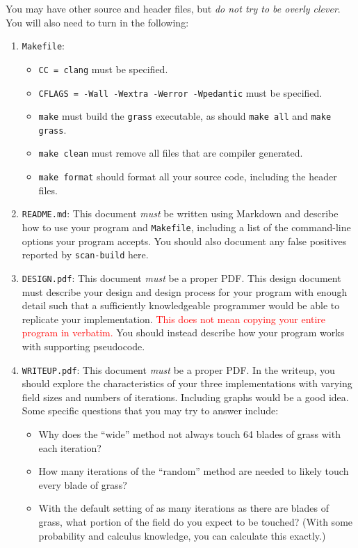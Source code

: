 \documentclass[11pt]{article}
\begin{document}
You may have other source and header files, but \emph{do not try to be overly clever}. You will also need to turn in the following:

\begin{enumerate}
    \item \texttt{Makefile}: \begin{itemize}
        \item \texttt{CC = clang} must be specified.
        \item \texttt{CFLAGS = -Wall -Wextra -Werror -Wpedantic} must be specified.
        \item \texttt{make} must build the \texttt{grass} executable, as should \texttt{make all} and \texttt{make grass}.
        \item \texttt{make clean} must remove all files that are compiler generated.
        \item \texttt{make format} should format all your source code, including the header files.
    \end{itemize}
    \item \texttt{README.md}: This document \emph{must} be written using Markdown and describe how to use your program and \texttt{Makefile}, including a list of the command-line options your program accepts. You should also document any false positives reported by \texttt{scan-build} here.
    \item \texttt{DESIGN.pdf}: This document \emph{must} be a proper PDF. This design document must describe your design and design process for your program with enough detail such that a sufficiently knowledgeable programmer would be able to replicate your implementation. \textcolor{red}{This does not mean copying your entire program in verbatim.} You should instead describe how your program works with supporting pseudocode.
    \item \texttt{WRITEUP.pdf}: This document \emph{must} be a proper PDF. In the writeup, you should explore the characteristics of your three implementations with varying field sizes and numbers of iterations. Including graphs would be a good idea. Some specific questions that you may try to answer include: \begin{itemize}
        \item Why does the ``wide'' method not always touch 64 blades of grass with each iteration?
        \item How many iterations of the ``random'' method are needed to likely touch every blade of grass?
        \item With the default setting of as many iterations as there are blades of grass, what portion of the field do you expect to be touched? (With some probability and calculus knowledge, you can calculate this exactly.)
    \end{itemize}
\end{enumerate}
\end{document}
